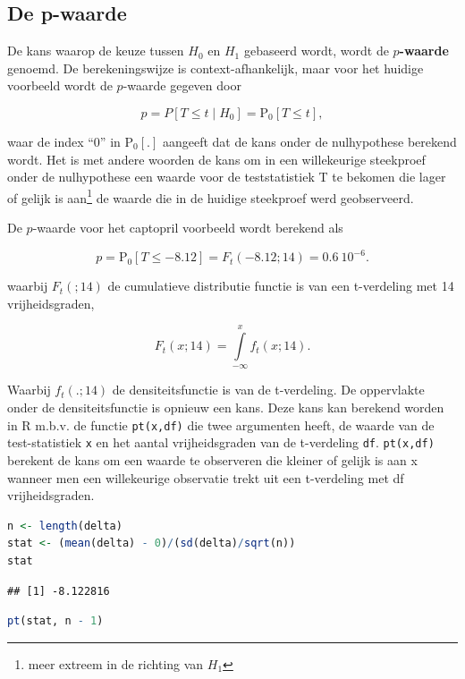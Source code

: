 \documentclass[
  12pt,dutch,coursenotes]{book}
\newcommand{\passthrough}[1]{#1}
\theoremstyle{definition}
\theoremstyle{definition}
\theoremstyle{definition}
\theoremstyle{definition}
\theoremstyle{remark}
\begin{document}
\hypertarget{de-p-waarde}{%
\subsection{De p-waarde}\label{de-p-waarde}}

De kans waarop de keuze tussen \(H_0\) en \(H_1\) gebaseerd wordt, wordt de \textbf{\(p\)-waarde} genoemd. De berekeningswijze is context-afhankelijk, maar voor het huidige voorbeeld wordt de \(p\)-waarde gegeven door

\[
    p = P\left[T \leq t \mid H_0\right] = \text{P}_0\left[T\leq t\right],
  \]

waar de index ``0'' in \(\text{P}_0\left[.\right]\) aangeeft dat de kans onder de nulhypothese berekend wordt. Het is met andere woorden de kans om in een willekeurige steekproef onder de nulhypothese een waarde voor de teststatistiek T te bekomen die lager of gelijk is aan\footnote{meer extreem in de richting van \(H_1\)} de waarde die in de huidige steekproef werd geobserveerd.

De \(p\)-waarde voor het captopril voorbeeld wordt berekend als

\[p= \text{P}_0\left[T\leq -8.12\right]=F_t(-8.12;14) = 0.6\ 10^{-6}.\]

waarbij \(F_t(;14)\) de cumulatieve distributie functie is van een t-verdeling met 14 vrijheidsgraden,

\[F_t(x;14)=\int\limits_{-\infty}^{x} f_t(x;14).\]

Waarbij \(f_t(.;14)\) de densiteitsfunctie is van de t-verdeling.
De oppervlakte onder de densiteitsfunctie is opnieuw een kans.
Deze kans kan berekend worden in R m.b.v. de functie \passthrough{\lstinline!pt(x,df)!} die twee argumenten heeft, de waarde van de test-statistiek \passthrough{\lstinline!x!} en het aantal vrijheidsgraden van de t-verdeling \passthrough{\lstinline!df!}.
\passthrough{\lstinline!pt(x,df)!} berekent de kans om een waarde te observeren die kleiner of gelijk is aan x wanneer men een willekeurige observatie trekt uit een t-verdeling met df vrijheidsgraden.

\begin{lstlisting}[language=R]
n <- length(delta)
stat <- (mean(delta) - 0)/(sd(delta)/sqrt(n))
stat
\end{lstlisting}

\begin{lstlisting}
## [1] -8.122816
\end{lstlisting}

\begin{lstlisting}[language=R]
pt(stat, n - 1)
\end{lstlisting}
\end{document}
